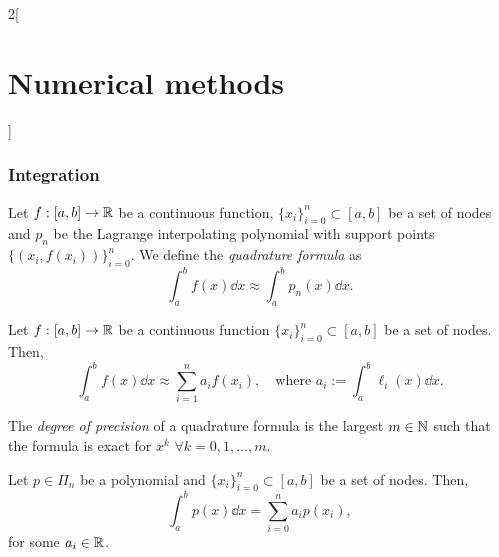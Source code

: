 \documentclass[../../../main.tex]{subfiles}
\begin{document}
\begin{multicols}{2}[\section{Numerical methods}]
\subsubsection*{Integration}
\begin{definition}
    Let $f:[a,b]\rightarrow\mathbb{R}$ be a continuous function, $\{x_i\}_{i=0}^n\subset[a,b]$ be a set of nodes and $p_n$ be the Lagrange interpolating polynomial with support points $\{(x_i,f(x_i))\}_{i=0}^n$. We define the \textit{quadrature formula} as $$\int_a^bf(x)\dd x\approx\int_a^bp_n(x)\dd x.$$
\end{definition}
\begin{lemma}
    Let $f:[a,b]\rightarrow\mathbb{R}$ be a continuous function $\{x_i\}_{i=0}^n\subset[a,b]$ be a set of nodes. Then, $$\int_a^bf(x)\dd x\approx\sum_{i=1}^na_if(x_i),\quad\text{where }a_i:=\int_a^b\ell_i(x)\dd x.$$
\end{lemma}
\begin{definition}
    The \textit{degree of precision} of a quadrature formula is the largest $m\in\mathbb{N}$ such that the formula is exact for $x^k$ $\forall k=0,1,\ldots,m$.
\end{definition}
\begin{lemma}
    Let $p\in\Pi_n$ be a polynomial and $\{x_i\}_{i=0}^n\subset[a,b]$ be a set of nodes. Then, $$\int_a^bp(x)\dd x=\sum_{i=0}^na_ip(x_i),$$ for some $a_i\in\mathbb{R}$.
\end{lemma}

\end{multicols}
\end{document}
